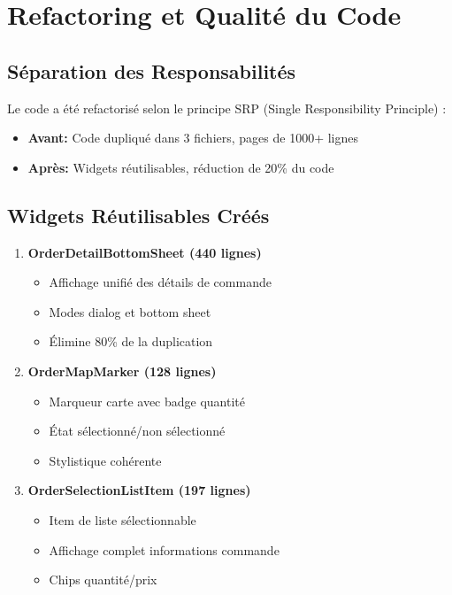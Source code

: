 \documentclass[12pt,a4paper]{report}
\begin{document}
\section{Refactoring et Qualité du Code}

\subsection{Séparation des Responsabilités}

Le code a été refactorisé selon le principe SRP (Single Responsibility Principle) :

\begin{itemize}
    \item \textbf{Avant:} Code dupliqué dans 3 fichiers, pages de 1000+ lignes
    \item \textbf{Après:} Widgets réutilisables, réduction de 20\% du code
\end{itemize}

\subsection{Widgets Réutilisables Créés}

\begin{enumerate}
    \item \textbf{OrderDetailBottomSheet (440 lignes)}
    \begin{itemize}
        \item Affichage unifié des détails de commande
        \item Modes dialog et bottom sheet
        \item Élimine 80\% de la duplication
    \end{itemize}

    \item \textbf{OrderMapMarker (128 lignes)}
    \begin{itemize}
        \item Marqueur carte avec badge quantité
        \item État sélectionné/non sélectionné
        \item Stylistique cohérente
    \end{itemize}

    \item \textbf{OrderSelectionListItem (197 lignes)}
    \begin{itemize}
        \item Item de liste sélectionnable
        \item Affichage complet informations commande
        \item Chips quantité/prix
    \end{itemize}
\end{enumerate}
\end{document}
